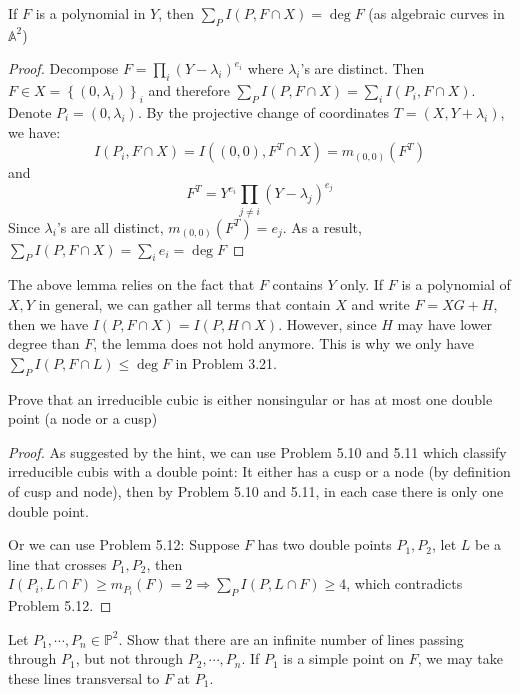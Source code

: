 \documentclass{solution}
\begin{document}
\begin{lemma}
    If $F$ is a polynomial in $Y$, then $\sum\limits_{P} I(P, F \cap X) = \deg F$ (as algebraic curves in $\mathbb{A}^2$)
\end{lemma}

\begin{proof}
    Decompose $F = \prod\limits_{i} (Y - \lambda_i)^{e_i}$ where $\lambda_i$'s are distinct. Then $F \in X = \left\lbrace (0, \lambda_i) \right\rbrace_i$ and therefore $\sum\limits_{P} I(P, F \cap X) = \sum\limits_{i} I(P_i, F \cap X)$. Denote $P_i = (0, \lambda_i)$. By the projective change of coordinates $T = (X, Y + \lambda_i)$, we have:
    $$I(P_i, F \cap X) = I((0, 0), F^T \cap X) = m_{(0, 0)}(F^T)$$
    and
    $$F^T = Y^{e_i} \prod\limits_{j \ne i} (Y - \lambda_j)^{e_j}$$
    Since $\lambda_i$'s are all distinct, $m_{(0, 0)}(F^T) = e_j$. As a result, $\sum\limits_{P} I(P, F \cap X) = \sum\limits_{i} e_i = \deg F$
\end{proof}

The above lemma relies on the fact that $F$ contains $Y$ only. If $F$ is a polynomial of $X, Y$ in general, we can gather all terms that contain $X$ and write $F = XG + H$, then we have $I(P, F \cap X) = I(P, H \cap X)$. However, since $H$ may have lower degree than $F$, the lemma does not hold anymore. This is why we only have $\sum\limits_{P} I(P, F \cap L) \le \deg F$ in Problem 3.21.

\begin{problem}{5.13}
    Prove that an irreducible cubic is either nonsingular or has at most one double point (a node or a cusp)
\end{problem}

\begin{proof}
    As suggested by the hint, we can use Problem 5.10 and 5.11 which classify irreducible cubis with a double point: It either has a cusp or a node (by definition of cusp and node), then by Problem 5.10 and 5.11, in each case there is only one double point.

    Or we can use Problem 5.12: Suppose $F$ has two double points $P_1, P_2$, let $L$ be a line that crosses $P_1, P_2$, then $I(P_i, L \cap F) \ge m_{P_i}(F) = 2 \Rightarrow \sum\limits_{P} I(P, L \cap F) \ge 4$, which contradicts Problem 5.12.
\end{proof}

\begin{problem}{5.14}
    Let $P_1, \cdots, P_n \in \mathbb{P}^2$. Show that there are an infinite number of lines passing through $P_1$, but not through $P_2, \cdots, P_n$. If $P_1$ is a simple point on $F$, we may take these lines transversal to $F$ at $P_1$.
\end{problem}
\end{document}
